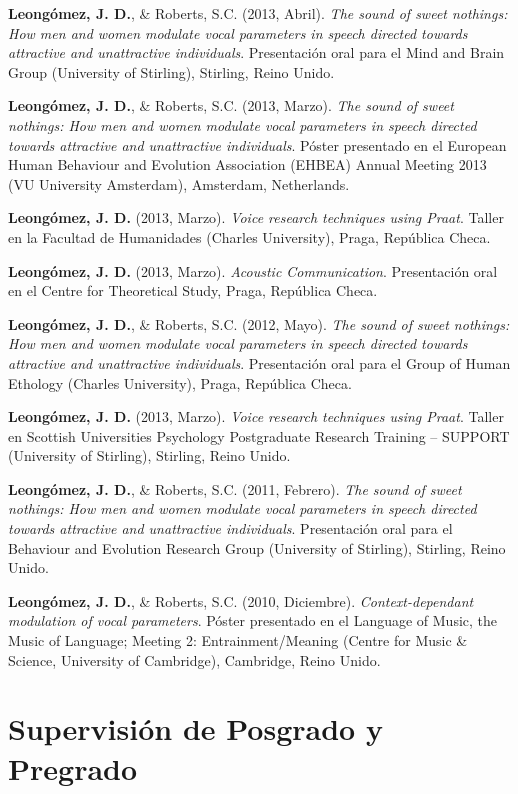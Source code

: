 \documentclass[11pt, a4paper]{awesome-cv}
\begin{document}
\textbf{Leongómez, J. D.}, \& Roberts, S.C. (2013, Abril). \emph{The
sound of sweet nothings: How men and women modulate vocal parameters in
speech directed towards attractive and unattractive individuals}.
Presentación oral para el Mind and Brain Group (University of Stirling),
Stirling, Reino Unido.

\textbf{Leongómez, J. D.}, \& Roberts, S.C. (2013, Marzo). \emph{The
sound of sweet nothings: How men and women modulate vocal parameters in
speech directed towards attractive and unattractive individuals}. Póster
presentado en el European Human Behaviour and Evolution Association
(EHBEA) Annual Meeting 2013 (VU University Amsterdam), Amsterdam,
Netherlands.

\textbf{Leongómez, J. D.} (2013, Marzo). \emph{Voice research techniques
using Praat}. Taller en la Facultad de Humanidades (Charles University),
Praga, República Checa.

\textbf{Leongómez, J. D.} (2013, Marzo). \emph{Acoustic Communication}.
Presentación oral en el Centre for Theoretical Study, Praga, República
Checa.

\textbf{Leongómez, J. D.}, \& Roberts, S.C. (2012, Mayo). \emph{The
sound of sweet nothings: How men and women modulate vocal parameters in
speech directed towards attractive and unattractive individuals}.
Presentación oral para el Group of Human Ethology (Charles University),
Praga, República Checa.

\textbf{Leongómez, J. D.} (2013, Marzo). \emph{Voice research techniques
using Praat}. Taller en Scottish Universities Psychology Postgraduate
Research Training -- SUPPORT (University of Stirling), Stirling, Reino
Unido.

\textbf{Leongómez, J. D.}, \& Roberts, S.C. (2011, Febrero). \emph{The
sound of sweet nothings: How men and women modulate vocal parameters in
speech directed towards attractive and unattractive individuals}.
Presentación oral para el Behaviour and Evolution Research Group
(University of Stirling), Stirling, Reino Unido.

\textbf{Leongómez, J. D.}, \& Roberts, S.C. (2010, Diciembre).
\emph{Context-dependant modulation of vocal parameters}. Póster
presentado en el Language of Music, the Music of Language; Meeting 2:
Entrainment/Meaning (Centre for Music \& Science, University of
Cambridge), Cambridge, Reino Unido.

\endgroup

\newpage

\hypertarget{supervisiuxf3n-de-posgrado-y-pregrado}{%
\section{Supervisión de Posgrado y
Pregrado}\label{supervisiuxf3n-de-posgrado-y-pregrado}}
\end{document}
